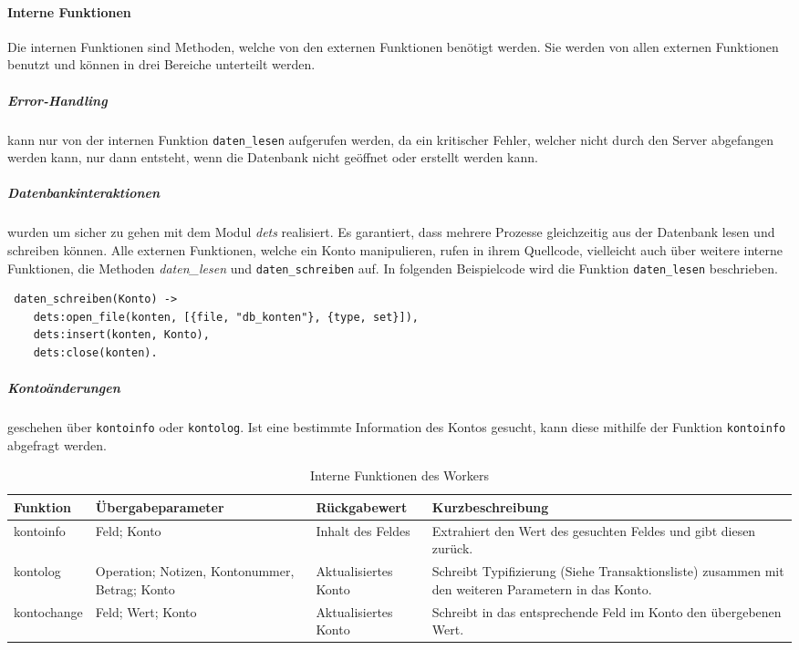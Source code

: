 \paragraph{Interne Funktionen}
Die internen Funktionen sind Methoden, welche von den externen Funktionen benötigt werden. Sie werden von allen externen Funktionen benutzt und können in drei Bereiche unterteilt werden.
\subparagraph{Error-Handling}
 kann nur von der internen Funktion \texttt{daten\_lesen} aufgerufen werden, da ein kritischer Fehler, welcher nicht durch den Server abgefangen werden kann, nur dann entsteht, wenn die Datenbank nicht geöffnet oder erstellt werden kann.
\subparagraph{Datenbankinteraktionen} wurden um sicher zu gehen mit dem Modul \textit{dets} realisiert. Es garantiert, dass mehrere Prozesse gleichzeitig aus der Datenbank lesen und schreiben können. Alle externen Funktionen, welche ein Konto manipulieren, rufen in ihrem Quellcode, vielleicht auch über weitere interne Funktionen, die Methoden \textit{daten\_lesen} und \texttt{daten\_schreiben} auf. In folgenden Beispielcode wird die Funktion \texttt{daten\_lesen} beschrieben.
\begin{lstlisting}
 daten_schreiben(Konto) -> 
 	dets:open_file(konten, [{file, "db_konten"}, {type, set}]),
 	dets:insert(konten, Konto),
 	dets:close(konten).	
\end{lstlisting}
\subparagraph{Kontoänderungen} geschehen über \texttt{kontoinfo} oder \texttt{kontolog}. Ist eine bestimmte Information des Kontos gesucht, kann diese mithilfe der Funktion \texttt{kontoinfo} abgefragt werden.
\\
\begin{table}[H]
\caption{Interne Funktionen des Workers}
\begin{center}
\begin{tabular}{p{3 cm}|p{3 cm}|p{3 cm}|p{5 cm}}
Funktion & Übergabeparameter & Rückgabewert & Kurzbeschreibung \\
				\hline
				\hline
kontoinfo & 
Feld; Konto & 
Inhalt des Feldes & 
Extrahiert den Wert des gesuchten Feldes und gibt diesen zurück.\\ \hline

kontolog & 
Operation; {Notizen, Kontonummer, Betrag}; Konto & 
Aktualisiertes Konto & 
Schreibt Typifizierung (Siehe Transaktionsliste) zusammen mit den weiteren Parametern in das Konto.\\ \hline

kontochange & 
Feld; Wert; Konto & 
Aktualisiertes Konto & 
Schreibt in das entsprechende Feld im Konto den übergebenen Wert.\\ \hline
\end{tabular}\\
\end{center}
\end{table}
